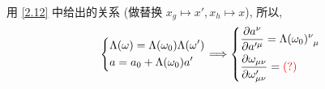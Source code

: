 \documentclass[10pt, a4paper]{article}
\numberwithin{equation}{section}
\begin{document}
\begin{itemize}
		\begin{tcolorbox}[title=calculation:]
			用 \eqref{2.12} 中给出的关系 (做替换 $x_g \mapsto x', x_h \mapsto x$), 所以,
			\begin{equation}
				\begin{dcases}
					\Lambda(\omega) = \Lambda(\omega_0) \Lambda(\omega') \\
					a = a_0 + \Lambda(\omega_0) a'
				\end{dcases} \Longrightarrow \begin{dcases}
					\frac{\partial a^\nu}{\partial a'^\mu} = \tensor{\Lambda(\omega_0)}{^\nu_\mu} \\
					\frac{\partial \omega_{\mu \nu}}{\partial \omega'_{\mu \nu}} = \mathcolor{red}{(?)}
				\end{dcases}
			\end{equation}
		\end{tcolorbox}
	\end{itemize}
\end{document}

